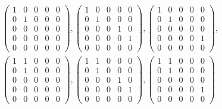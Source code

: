 \documentclass[11pt]{scrartcl}
\begin{document}
\begin{soln}
  \begin{align}
    &\begin{pmatrix}
      1 & 0 & 0 & 0 & 0\\
      0 & 1 & 0 & 0 & 0\\
      0 & 0 & 0 & 0 & 0\\
      0 & 0 & 0 & 0 & 0\\
      0 & 0 & 0 & 0 & 0
    \end{pmatrix},
    \begin{pmatrix}
      1 & 0 & 0 & 0 & 0\\
      0 & 1 & 0 & 0 & 0\\
      0 & 0 & 0 & 1 & 0\\
      0 & 0 & 0 & 0 & 1\\
      0 & 0 & 0 & 0 & 0
    \end{pmatrix},
    \begin{pmatrix}
      1 & 0 & 0 & 0 & 0\\
      0 & 1 & 0 & 0 & 0\\
      0 & 0 & 0 & 0 & 0\\
      0 & 0 & 0 & 0 & 1\\
      0 & 0 & 0 & 0 & 0
    \end{pmatrix},\\
    &\begin{pmatrix}
      1 & 1 & 0 & 0 & 0\\
      0 & 1 & 0 & 0 & 0\\
      0 & 0 & 0 & 0 & 0\\
      0 & 0 & 0 & 0 & 0\\
      0 & 0 & 0 & 0 & 0
    \end{pmatrix},
    \begin{pmatrix}
      1 & 1 & 0 & 0 & 0\\
      0 & 1 & 0 & 0 & 0\\
      0 & 0 & 0 & 1 & 0\\
      0 & 0 & 0 & 0 & 1\\
      0 & 0 & 0 & 0 & 0
    \end{pmatrix},
    \begin{pmatrix}
      1 & 1 & 0 & 0 & 0\\
      0 & 1 & 0 & 0 & 0\\
      0 & 0 & 0 & 0 & 0\\
      0 & 0 & 0 & 0 & 1\\
      0 & 0 & 0 & 0 & 0
    \end{pmatrix}
  \end{align}


\end{soln}
\end{document}
